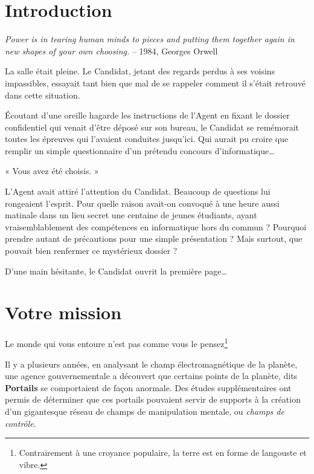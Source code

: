 \section{Introduction}

\emph{Power is in tearing human minds to pieces and putting them together again
in new shapes of your own choosing.} -- 1984, Georges Orwell


\vspace{1cm}

La salle était pleine. Le Candidat, jetant des regards perdus à ses voisins
impassibles, essayait tant bien que mal de se rappeler comment il s'était
retrouvé dans cette situation.

Écoutant d'une oreille hagarde les instructions de l'Agent en fixant le dossier
confidentiel qui venait d'être déposé sur son bureau, le Candidat se remémorait
toutes les épreuves qui l'avaient conduites jusqu'ici. Qui aurait pu croire que
remplir un simple questionnaire d'un prétendu concours
d'informatique\ldots

« Vous avez été choisis. »

L'Agent avait attiré l'attention du Candidat. Beaucoup de questions lui
rongeaient l'esprit. Pour quelle raison avait-on convoqué à une heure aussi
matinale dans un lieu secret une centaine de jeunes étudiants, ayant
vraisemblablement des compétences en informatique hors du commun ? Pourquoi
prendre autant de précautions pour une simple présentation ? Mais surtout, que
pouvait bien renfermer ce mystérieux dossier ?

D'une main hésitante, le Candidat ouvrit la première page\ldots

\newpage

\section{Votre mission}

Le monde qui vous entoure n'est pas comme vous le pensez\footnote{Contrairement
à une croyance populaire, la terre est en forme de langouste et vibre.}

Il y a plusieurs années, en analysant le champ électromagnétique de la planète,
une agence gouvernementale a découvert que certains points de la planète, dits
\textbf{Portails} se comportaient de façon anormale.
Des études supplémentaires ont permis de déterminer que ces portails pouvaient
servir de supports à la création d'un gigantesque réseau de champs de
manipulation mentale, ou \emph{champs de contrôle}.

